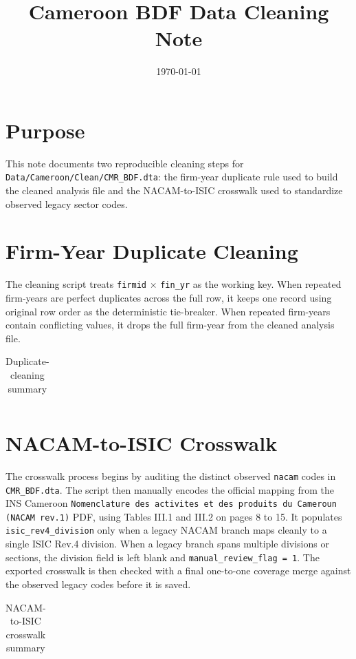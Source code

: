 \documentclass[11pt]{article}
\title{Cameroon BDF Data Cleaning Note}
\author{}
\date{\today}
\begin{document}
\maketitle

\section{Purpose}

This note documents two reproducible cleaning steps for \texttt{Data/Cameroon/Clean/CMR\_BDF.dta}: the firm-year duplicate rule used to build the cleaned analysis file and the NACAM-to-ISIC crosswalk used to standardize observed legacy sector codes.

\section{Firm-Year Duplicate Cleaning}

The cleaning script treats \texttt{firmid} $\times$ \texttt{fin\_yr} as the working key. When repeated firm-years are perfect duplicates across the full row, it keeps one record using original row order as the deterministic tie-breaker. When repeated firm-years contain conflicting values, it drops the full firm-year from the cleaned analysis file.

\begin{table}[H]
\centering
\caption{Duplicate-cleaning summary}
\label{tab:duplicate-cleaning}
\begin{tabular}{lr}

\end{tabular}
\end{table}

\section{NACAM-to-ISIC Crosswalk}

The crosswalk process begins by auditing the distinct observed \texttt{nacam} codes in \texttt{CMR\_BDF.dta}. The script then manually encodes the official mapping from the INS Cameroon \texttt{Nomenclature des activites et des produits du Cameroun (NACAM rev.1)} PDF, using Tables III.1 and III.2 on pages 8 to 15. It populates \texttt{isic\_rev4\_division} only when a legacy NACAM branch maps cleanly to a single ISIC Rev.4 division. When a legacy branch spans multiple divisions or sections, the division field is left blank and \texttt{manual\_review\_flag = 1}. The exported crosswalk is then checked with a final one-to-one coverage merge against the observed legacy codes before it is saved.

\begin{table}[H]
\centering
\caption{NACAM-to-ISIC crosswalk summary}
\label{tab:crosswalk-summary}
\begin{tabular}{lr}

\end{tabular}
\end{table}
\end{document}
